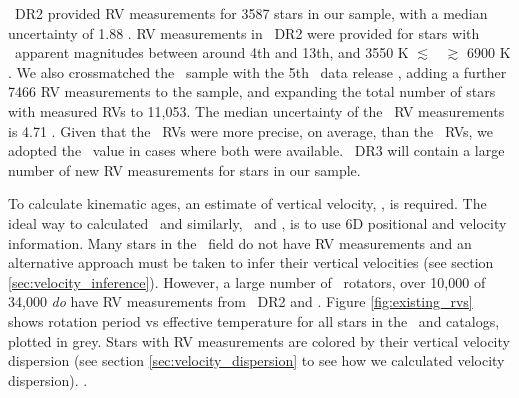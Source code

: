 \gaia\ DR2 provided RV measurements for 3587 stars in our sample, with a
median uncertainty of 1.88 \kms.
RV measurements in \gaia\ DR2 were provided for stars with \gaia\ apparent
magnitudes between around 4th and 13th, and 3550 K $\lesssim$ \teff\ $\gtrsim$
6900 K \citep{brown2018}.
We also crossmatched the \mct\ sample with the 5th \lamost\ data release
\citep{cui2012, xiang2019}, adding a further 7466 RV measurements to the
sample, and expanding the total number of stars with measured RVs to 11,053.
The median uncertainty of the \lamost\ RV measurements is 4.71 \kms.
Given that the \gaia\ RVs were more precise, on average, than the \lamost\
RVs, we adopted the \gaia\ value in cases where both were available.
\gaia\ DR3 will contain a large number of new RV measurements for stars in our
sample.

To calculate kinematic ages, an estimate of vertical velocity, \vz, is
required.
The ideal way to calculated \vz\, and similarly, \vx\ and \vy, is to use 6D
positional and velocity information.
Many stars in the \kepler\ field do not have RV measurements and an
alternative approach must be taken to infer their vertical velocities (see
section \ref{sec:velocity_inference}).
However, a large number of \kepler\ rotators, over 10,000 of 34,000 {\it do}
have RV measurements from \gaia\ DR2 and \lamost.
Figure \ref{fig:existing_rvs} shows rotation period vs effective temperature
for all stars in the \mct\ and \citet{santos2019} catalogs, plotted in grey.
Stars with RV measurements are colored by their vertical velocity dispersion
(see section \ref{sec:velocity_dispersion} to see how we calculated velocity
dispersion).
.

